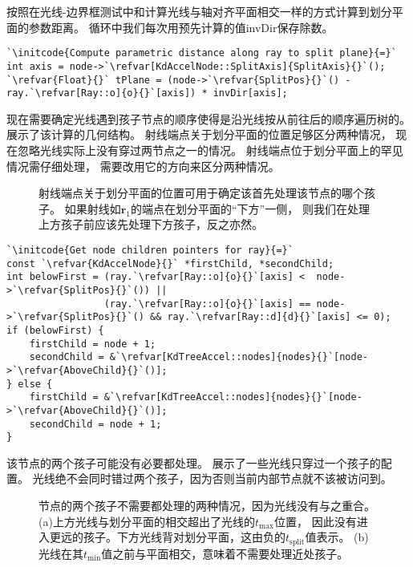 按照在光线-边界框测试中和计算光线与轴对齐平面相交一样的方式计算到划分平面的参数距离。
循环中我们每次用预先计算的值{\ttfamily invDir}保存除数。
\begin{lstlisting}
`\initcode{Compute parametric distance along ray to split plane}{=}`
int axis = node->`\refvar[KdAccelNode::SplitAxis]{SplitAxis}{}`();
`\refvar{Float}{}` tPlane = (node->`\refvar{SplitPos}{}`() - ray.`\refvar[Ray::o]{o}{}`[axis]) * invDir[axis];
\end{lstlisting}

现在需要确定光线遇到孩子节点的顺序使得是沿光线按从前往后的顺序遍历树的。
展示了该计算的几何结构。
射线端点关于划分平面的位置足够区分两种情况，
现在忽略光线实际上没有穿过两节点之一的情况。
射线端点位于划分平面上的罕见情况需仔细处理，
需要改用它的方向来区分两种情况。
\begin{figure}[htbp]
    \centering
    \caption{射线端点关于划分平面的位置可用于确定该首先处理该节点的哪个孩子。
    如果射线如$\bm r_1$的端点在划分平面的“下方”一侧，
    则我们在处理上方孩子前应该先处理下方孩子，反之亦然。}
    \label{fig:4.18}
\end{figure}
\begin{lstlisting}
`\initcode{Get node children pointers for ray}{=}`
const `\refvar{KdAccelNode}{}` *firstChild, *secondChild;
int belowFirst = (ray.`\refvar[Ray::o]{o}{}`[axis] <  node->`\refvar{SplitPos}{}`()) ||
                 (ray.`\refvar[Ray::o]{o}{}`[axis] == node->`\refvar{SplitPos}{}`() && ray.`\refvar[Ray::d]{d}{}`[axis] <= 0);
if (belowFirst) {
    firstChild = node + 1;
    secondChild = &`\refvar[KdTreeAccel::nodes]{nodes}{}`[node->`\refvar{AboveChild}{}`()];
} else {
    firstChild = &`\refvar[KdTreeAccel::nodes]{nodes}{}`[node->`\refvar{AboveChild}{}`()];
    secondChild = node + 1;
}
\end{lstlisting}

该节点的两个孩子可能没有必要都处理。
展示了一些光线只穿过一个孩子的配置。
光线绝不会同时错过两个孩子，因为否则当前内部节点就不该被访问到。
\begin{figure}[htbp]
    \centering
    \caption{节点的两个孩子不需要都处理的两种情况，因为光线没有与之重合。
    (a)上方光线与划分平面的相交超出了光线的$t_{\max}$位置，
    因此没有进入更远的孩子。下方光线背对划分平面，这由负的$t_{\text{split}}$值表示。
    (b)光线在其$t_{\min}$值之前与平面相交，意味着不需要处理近处孩子。}
    \label{fig:4.19}
\end{figure}

